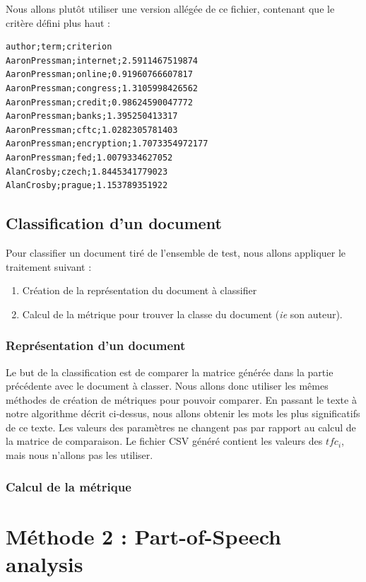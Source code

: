 \documentclass[a4paper]{article}
\begin{document}
Nous allons plutôt utiliser une version allégée de ce fichier, contenant que le critère défini plus haut :

\begin{Verbatim}[frame=lines,labelposition=topline]
author;term;criterion
AaronPressman;internet;2.5911467519874
AaronPressman;online;0.91960766607817
AaronPressman;congress;1.3105998426562
AaronPressman;credit;0.98624590047772
AaronPressman;banks;1.395250413317
AaronPressman;cftc;1.0282305781403
AaronPressman;encryption;1.7073354972177
AaronPressman;fed;1.0079334627052
AlanCrosby;czech;1.8445341779023
AlanCrosby;prague;1.153789351922
\end{Verbatim}

\subsection{Classification d'un document}
Pour classifier un document tiré de l'ensemble de test, nous allons appliquer le traitement suivant :
\begin{enumerate}
\item Création de la représentation du document à classifier
\item Calcul de la métrique pour trouver la classe du document (\textit{ie} son auteur).
\end{enumerate}

\subsubsection{Représentation d'un document}
Le but de la classification est de comparer la matrice générée dans la partie précédente avec le document à classer. Nous allons donc utiliser les mêmes méthodes de création de métriques pour pouvoir comparer. En passant le texte à notre algorithme décrit ci-dessus, nous allons obtenir les mots les plus significatifs de ce texte. Les valeurs des paramètres ne changent pas par rapport au calcul de la matrice de comparaison. Le fichier CSV généré contient les valeurs des $tfc_{i}$, mais nous n'allons pas les utiliser. 


\subsubsection{Calcul de la métrique}


\section{Méthode 2 : Part-of-Speech analysis}
\end{document}
